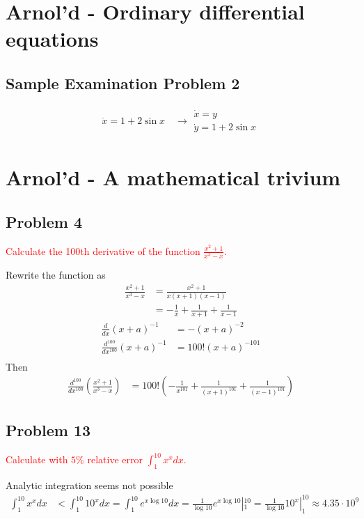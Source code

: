 \documentclass[10pt,a4paper]{book}
\theoremstyle{definition}
\begin{document}
\section{{\sc Arnol'd} - Ordinary differential equations}
\subsection{Sample Examination Problem 2}
\begin{align}
\ddot x=1+2\sin x\quad\rightarrow
\begin{array}{l}
\dot x=y\\
\dot y=1+2\sin x
\end{array}
\end{align}

\section{{\sc Arnol'd} - A mathematical trivium}
\subsection{Problem 4}
\textcolor{red}{Calculate the 100th derivative of the function $\frac{x^2+1}{x^3-x}$.}

Rewrite the function as
\begin{align}
    \frac{x^2+1}{x^3-x}&=\frac{x^2+1}{x(x+1)(x-1)}\\
    &=-\frac{1}{x}+\frac{1}{x+1}+\frac{1}{x-1}
\end{align}
\begin{align}
    \frac{d}{dx}(x+a)^{-1}&=-(x+a)^{-2}\\
    \frac{d^{100}}{dx^{100}}(x+a)^{-1}&=100!(x+a)^{-101}\\
\end{align}
Then
\begin{align}
    \frac{d^{100}}{dx^{100}}\left(\frac{x^2+1}{x^3-x}\right)&=100!\left(-\frac{1}{x^{101}}+\frac{1}{(x+1)^{101}}+\frac{1}{(x-1)^{101}}\right)
\end{align}

\subsection{Problem 13}
\textcolor{red}{Calculate with $5\%$ relative error $\int_1^{10} x^x dx$.}

Analytic integration seems not possible 
\begin{align}
    \int_1^{10} x^x dx&<\int_1^{10} 10^x dx=\int_1^{10} e^{x\log10} dx=\frac{1}{\log 10}e^{x\log10}|_1^{10}=\frac{1}{\log 10}10^x|_1^{10}\approx4.35\cdot10^{9}
\end{align}
\end{document}
